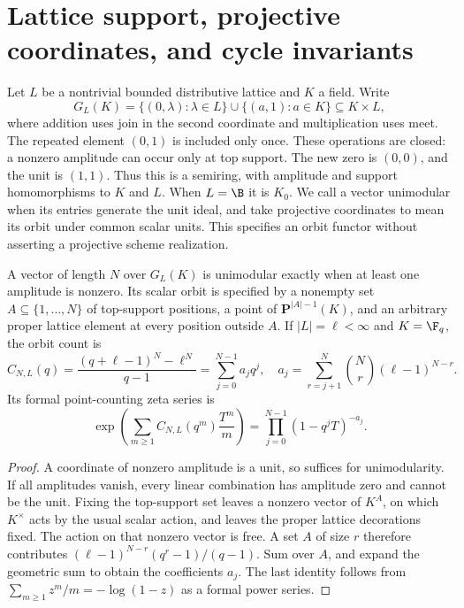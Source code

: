\section{Lattice support, projective coordinates, and cycle invariants}
\label{sec:lattice-coordinate-geometry}
Let $L$ be a nontrivial bounded distributive lattice and $K$ a field. Write
\[
 G_L(K)=\{(0,\lambda):\lambda\in L\}\cup\{(a,1):a\in K\}
 \subseteq K\times L,
\]
where addition uses join in the second coordinate and multiplication uses
meet. The repeated element $(0,1)$ is included only once. These operations
are closed: a nonzero amplitude can occur only at top support. The new
zero is $(0,0)$, and the unit is $(1,1)$. Thus this is a semiring, with
amplitude and support homomorphisms to $K$ and $L$. When $L=\B$ it is
$K_0$. We call a vector unimodular when its entries generate the unit ideal,
and take projective coordinates to mean its orbit under common scalar
units. This specifies an orbit functor without asserting a projective
scheme realization.

\begin{proposition}\label{prop:lattice-profiles}
A vector of length $N$ over $G_L(K)$ is unimodular exactly when at least
one amplitude is nonzero. Its scalar orbit is specified by a nonempty
set $A\subseteq\{1,\ldots,N\}$ of top-support positions, a point of
$\mathbf P^{|A|-1}(K)$, and an arbitrary proper lattice element at every
position outside $A$. If $|L|=\ell<\infty$ and $K=\F_q$, the orbit count is
\[
 C_{N,L}(q)=\frac{(q+\ell-1)^N-\ell^N}{q-1}
 =\sum_{j=0}^{N-1}a_jq^j,
 \quad
 a_j=\sum_{r=j+1}^{N}\binom Nr(\ell-1)^{N-r}.
\]
Its formal point-counting zeta series is
\[
 \exp\!\left(\sum_{m\ge1}C_{N,L}(q^m)\frac{T^m}{m}\right)
 =\prod_{j=0}^{N-1}(1-q^jT)^{-a_j}.
\]
\end{proposition}
\begin{proof}
A coordinate of nonzero amplitude is a unit, so suffices for unimodularity.
If all amplitudes vanish, every linear combination has amplitude zero
and cannot be the unit. Fixing the top-support set leaves a nonzero vector
of $K^A$, on which $K^\times$ acts by the usual scalar action, and leaves
the proper lattice decorations fixed. The action on that nonzero vector
is free. A set $A$ of size $r$ therefore contributes
$(\ell-1)^{N-r}(q^r-1)/(q-1)$. Sum over $A$, and expand the geometric
sum to obtain the coefficients $a_j$. The last identity follows from
$\sum_{m\ge1}z^m/m=-\log(1-z)$ as a formal power series.
\end{proof}

